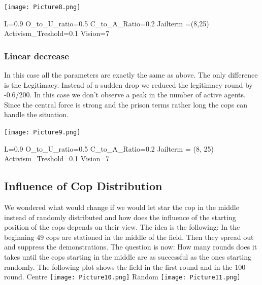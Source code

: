 \documentclass[11pt]{article}
\begin{document}
\texttt{[image: Picture8.png]}

L=0.9\newline
O\_to\_U\_ratio=0.5\newline
C\_to\_A\_Ratio=0.2\newline
Jailterm =(8,25)\newline
Activism\_Treshold=0.1\newline
Vision=7

\subsubsection{Linear decrease}
In this case all the parameters are exactly the same as above. The only difference is the Legitimacy. Instead of a sudden drop we reduced the legitimacy round by -0.6/200. In this case we don’t observe a peak in the number of active agents. Since the central force is strong and the prison terms rather long the cops can handle the situation.

\texttt{[image: Picture9.png]}

L=0.9\newline
O\_to\_U\_ratio=0.5\newline
C\_to\_A\_Ratio=0.2\newline
Jailterm = (8, 25)\newline
Activism\_Treshold=0.1\newline
Vision=7

\subsection{Influence of Cop Distribution}
We wondered what would change if we would let star the cop in the middle instead of randomly distributed and how does the influence of the starting position of the cops depends on their view.\newline
The idea is the following: In the beginning 49 cops are stationed in the middle of the field. Then they spread out and suppress the demonstrations. The question is now: How many rounds does it takes until the cops starting in the middle are as successful as the ones starting randomly.\newline
The following plot shows the field in the first round and in the 100 round. \newline
Centre\newline
\texttt{[image: Picture10.png]}\newline
Random\newline
\texttt{[image: Picture11.png]}\newline
\end{document}
